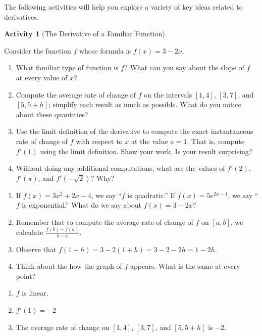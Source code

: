 \documentclass[10pt,]{book}
\theoremstyle{plain}
\theoremstyle{definition}
\theoremstyle{definition}
\theoremstyle{definition}
\theoremstyle{definition}
\newtheorem{activity}[project]{Activity}
\theoremstyle{definition}
\numberwithin{equation}{section}
\begin{document}
The following activities will help you explore a variety of key ideas related to derivatives.
%
\begin{activity}[The Derivative of a Familiar Function]\label{act-1-3-1}

          Consider the function \(f\) whose formula is \(\displaystyle f(x) = 3 - 2x\).
\leavevmode%
\begin{enumerate}[label=\alph*]
\item\hypertarget{li-125}{}What familiar type of function is \(f\)?  What can you say about the slope of \(f\) at every value of \(x\)?%
\item\hypertarget{li-126}{}Compute the average rate of change of \(f\) on the intervals \([1,4]\), \([3,7]\), and \([5,5+h]\); simplify each result as much as possible.  What do you notice about these quantities?%
\item\hypertarget{li-127}{}Use the limit definition of the derivative to compute the exact instantaneous rate of change of \(f\) with respect to \(x\) at the value \(a = 1\).  That is, compute \(f'(1)\) using the limit definition.  Show your work.  Is your result surprising?%
\item\hypertarget{li-128}{}Without doing any additional computations, what are the values of \(f'(2)\), \(f'(\pi)\), and \(f'(-\sqrt{2})\)?  Why?%
\end{enumerate}
\leavevmode%
\begin{enumerate}[label=\alph*]
\item\hypertarget{li-129}{}If \(f(x) = 3x^2 + 2x - 4\), we say ``\(f\) is quadratic.''  If \(f(x) = 5 e^{2x-1}\), we say ``\(f\) is exponential.''  What do we say about \(f(x) = 3-2x\)?%
\item\hypertarget{li-130}{}Remember that to compute the average rate of change of \(f\) on \([a,b]\), we calculate \(\frac{f(b)-f(a)}{b-a}\).%
\item\hypertarget{li-131}{}Observe that \(f(1+h) = 3 - 2(1+h) = 3 - 2 - 2h = 1 - 2h\).%
\item\hypertarget{li-132}{}Think about the how the graph of \(f\) appears.  What is the same at every point?%
\end{enumerate}
\leavevmode%
\begin{enumerate}[label=\alph*]
\item\hypertarget{li-133}{}\(f\) is linear.%
\item\hypertarget{li-134}{}\(f'(1)=-2\)%
\item\hypertarget{li-135}{}The average rate of change on \([1,4]\), \([3,7]\),  and \([5,5+h]\) is \(-2\). %

\end{enumerate}
\end{activity}
\end{document}
